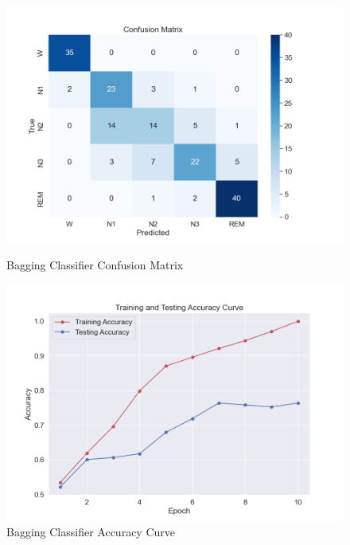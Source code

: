 \begin{figure}[H]
	\centering
	\begin{minipage}[b]{0.45\textwidth}
		\centering
		\includegraphics[width=\textwidth]{img/paper_1/BG_confusion_matrix.png}
		\caption{Bagging Classifier Confusion Matrix}
	\end{minipage}
	\hfill
	\begin{minipage}[b]{0.45\textwidth}
		\centering
		\includegraphics[width=\textwidth]{img/paper_1/accuracy_curve.png}
		\caption{Bagging Classifier Accuracy Curve}
	\end{minipage}
	
	\vspace{1em}
	

\end{figure}

